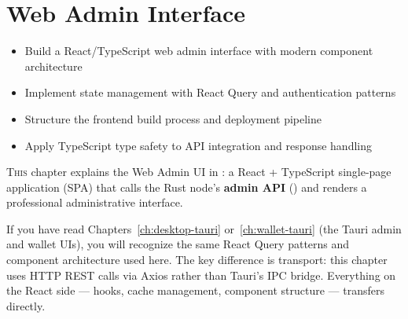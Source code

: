 \chapter{Web Admin Interface}
\label{ch:web-admin-ui}

\begin{learnbox}
\begin{itemize}
  \item Build a React/TypeScript web admin interface with modern component architecture
  \item Implement state management with React Query and authentication patterns
  \item Structure the frontend build process and deployment pipeline
  \item Apply TypeScript type safety to API integration and response handling
\end{itemize}
\end{learnbox}

\lettrine{T}{his} chapter explains the Web Admin UI in : a React + TypeScript single-page application (SPA) that calls the Rust node's \textbf{admin API} () and renders a professional administrative interface.

If you have read Chapters~\ref{ch:desktop-tauri} or~\ref{ch:wallet-tauri} (the Tauri admin and wallet UIs), you will recognize the same React Query patterns and component architecture used here. The key difference is transport: this chapter uses HTTP REST calls via Axios rather than Tauri's IPC bridge. Everything on the React side --- hooks, cache management, component structure --- transfers directly.

